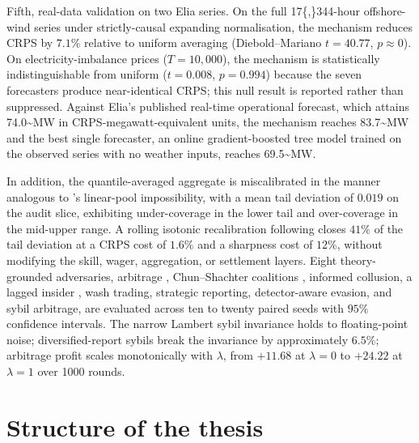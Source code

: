 \documentclass[
  11pt,
  a4paper,
  oneside]{report}
\begin{document}
Fifth, real-data validation on two Elia series. On the full
17\{,\}344-hour offshore-wind series under strictly-causal expanding
normalisation, the mechanism reduces CRPS by \(7.1\%\) relative to
uniform averaging (Diebold--Mariano \(t = 40.77\), \(p \approx 0\)). On
electricity-imbalance prices (\(T = 10{,}000\)), the mechanism is
statistically indistinguishable from uniform (\(t = 0.008\),
\(p = 0.994\)) because the seven forecasters produce near-identical
CRPS; this null result is reported rather than suppressed. Against
Elia's published real-time operational forecast, which attains
74.0\textasciitilde MW in CRPS-megawatt-equivalent units, the mechanism
reaches 83.7\textasciitilde MW and the best single forecaster, an online
gradient-boosted tree model trained on the observed series with no
weather inputs, reaches 69.5\textasciitilde MW.

In addition, the quantile-averaged aggregate is miscalibrated in the
manner analogous to \citet{ranjan2010combining}'s linear-pool
impossibility, with a mean tail deviation of \(0.019\) on the audit
slice, exhibiting under-coverage in the lower tail and over-coverage in
the mid-upper range. A rolling isotonic recalibration following
\citet{kuleshov2018accurate} closes \(41\%\) of the tail deviation at a
CRPS cost of \(1.6\%\) and a sharpness cost of \(12\%\), without
modifying the skill, wager, aggregation, or settlement layers. Eight
theory-grounded adversaries, arbitrage \citep{chen2014arbitrage},
Chun--Shachter coalitions \citep{chun2011cooperating}, informed
collusion, a lagged insider \citep{johnstone2007economic}, wash trading,
strategic reporting, detector-aware evasion, and sybil arbitrage, are
evaluated across ten to twenty paired seeds with \(95\%\) confidence
intervals. The narrow Lambert sybil invariance holds to floating-point
noise; diversified-report sybils break the invariance by approximately
\(6.5\%\); arbitrage profit scales monotonically with \(\lambda\), from
\(+11.68\) at \(\lambda = 0\) to \(+24.22\) at \(\lambda = 1\) over 1000
rounds.

\section{Structure of the thesis}\label{structure-of-the-thesis}
\end{document}

